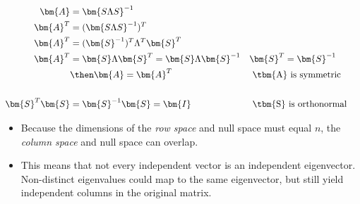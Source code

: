 \begin{itemize}
\begin{enumerate}
{\begin{enumerate}
      \end{enumerate}
    }

    \begin{align*}
      \bm{A} &= \bm{S\Lambda S}^{-1}  \\
      \bm{A}^T  &= (\bm{S\Lambda S}^{-1})^T   \\
      \bm{A}^T  &= (\bm{S}^{-1})^T \Lambda^T \bm{S}^T     \\
      \bm{A}^T  &= \bm{S} \Lambda \bm{S}^T = \bm{S} \Lambda \bm{S}^{-1}  && \bm{S}^T = \bm{S}^{-1}\\
                &\then \bm{A} = \bm{A}^T && ~\text{\tbm{A} is symmetric}~ \\\\
      \bm{S}^T \bm{S} &= \bm{S}^{-1}\bm{S} = \bm{I} && ~\text{\tbm{S} is orthonormal}~
    \end{align*}


    \begin{itemize}
      \item Because the dimensions of the \textit{row space} and null space
        must equal \(n\), the \textit{column space} and null space can overlap.
      \item This means that not every independent vector is an independent
        eigenvector. Non-distinct eigenvalues could map to the same
        eigenvector, but still yield independent columns in the original
        matrix.
    \end{itemize}

  \end{enumerate}
\end{itemize}

